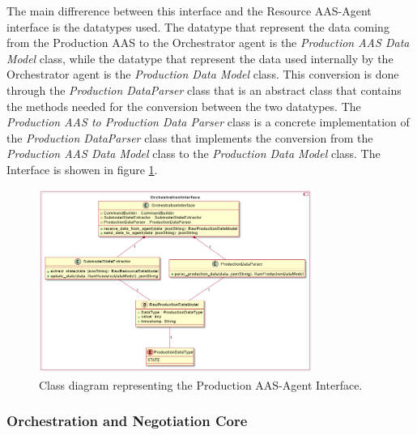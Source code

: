 The main diffrerence between this interface and the Resource AAS-Agent interface is the datatypes used.
The datatype that represent the data coming from the Production AAS to the Orchestrator agent is the \emph{Production AAS Data Model} class, while the datatype that represent the data used internally by the Orchestrator agent is the \emph{Production Data Model} class.
This conversion is done through the \emph{Production DataParser} class that is an abstract class that contains the methods needed for the conversion between the two datatypes.
The \emph{Production AAS to Production Data Parser} class is a concrete implementation of the \emph{Production DataParser} class that implements the conversion from the \emph{Production AAS Data Model} class to the \emph{Production Data Model} class.
The Interface is showen in figure \ref{fig:prod_aas_agent_interface_classes}.
\begin{figure}[ht]
    \centering  
    \includegraphics[width=0.8\textwidth]{Images/Production_Classes/Interface.png}
    \caption{Class diagram representing the Production AAS-Agent Interface.}
    \label{fig:prod_aas_agent_interface_classes}
\end{figure}

\newpage
\subsubsection{Orchestration and Negotiation Core}

